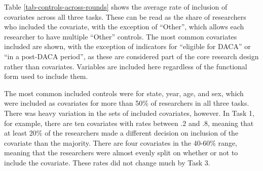 \documentclass[
  letterpaper,
  DIV=11,
  numbers=noendperiod]{scrartcl}
\begin{document}
\begin{table}[!htbp] \centering \renewcommand*{\arraystretch}{1.1}\caption{Estimation Methods}\label{tab-estimation-methods}
\end{table}

Table \ref{tab-controls-across-rounds} shows the average rate of
inclusion of covariates across all three tasks. These can be read as the
share of researchers who included the covariate, with the exception of
``Other'', which allows each researcher to have multiple ``Other''
controls. The most common covariates included are shown, with the
exception of indicators for ``eligible for DACA'' or ``in a post-DACA
period'', as these are considered part of the core research design
rather than covariates. Variables are included here regardless of the
functional form used to include them.

The most common included controls were for state, year, age, and sex,
which were included as covariates for more than 50\% of researchers in
all three tasks. There was heavy variation in the sets of included
covariates, however. In Task 1, for example, there are ten covariates
with rates between .2 and .8, meaning that at least 20\% of the
researchers made a different decision on inclusion of the covariate than
the majority. There are four covariates in the 40-60\% range, meaning
that the researchers were almost evenly split on whether or not to
include the covariate. These rates did not change much by Task 3.
\end{document}
